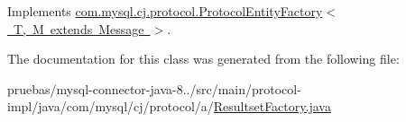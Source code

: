 Implements \mbox{\hyperlink{interfacecom_1_1mysql_1_1cj_1_1protocol_1_1_protocol_entity_factory_a288de4370d4af19186625e7404b4cca5}{com.\+mysql.\+cj.\+protocol.\+Protocol\+Entity\+Factory$<$ T, M extends Message $>$}}.



The documentation for this class was generated from the following file\+:\begin{DoxyCompactItemize}
\item 
pruebas/mysql-\/connector-\/java-\/8../src/main/protocol-\/impl/java/com/mysql/cj/protocol/a/\mbox{\hyperlink{protocol-impl_2java_2com_2mysql_2cj_2protocol_2a_2_resultset_factory_8java}{Resultset\+Factory.\+java}}\end{DoxyCompactItemize}
